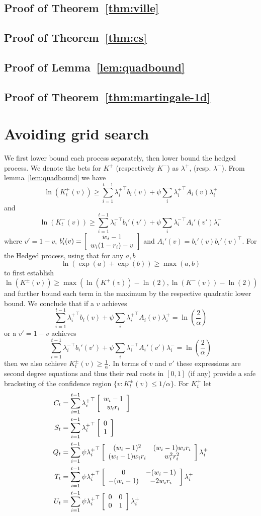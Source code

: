 \subsection{Proof of Theorem~\ref{thm:ville}}
\subsection{Proof of Theorem~\ref{thm:cs}}
\subsection{Proof of Lemma~\ref{lem:quadbound}}
\subsection{Proof of Theorem~\ref{thm:martingale-1d}}
\section{Avoiding grid search}
\label{app:nogrid2d}
We first lower bound each process separately, then lower bound
the hedged process. We denote the bets for $K^{+}$ (respectively
$K^{-}$) as $\lambda^{+}$, (resp. $\lambda^{-}$).
From lemma~\ref{lem:quadbound} we have
\[
\ln(K_t^{+}(v)) \geq \sum_{i=1}^{t-1} {\lambda_i^{+}}^\top b_i(v) + \psi \sum_i {\lambda_i^{+}}^\top A_i(v) {\lambda_i^{+}}
\]
and
\[
\ln(K_t^{-}(v)) \geq \sum_{i=1}^{t-1} {\lambda_i^{-}}^\top b_i'(v') + \psi \sum_i {\lambda_i^{-}}^\top A_i'(v') {\lambda_i^{-}}
\]
where $v'=1-v$, 
$b_i'(v)=
\left[\begin{array}{c} w_i-1 \\ w_i (1-r_i) -v \end{array}\right]
$
and $A_i'(v)=b_i'(v)b_i'(v)^\top$.
For the Hedged process, using that for any $a,b$
\[
\ln\left(\exp(a)+\exp(b)\right)\geq \max(a,b)
\]
to first establish
\[
\ln(K^{\pm}(v)) \geq \max(\ln(K^{+}(v))-\ln(2),\ln(K^{-}(v))-\ln(2))
\]
and further bound each term in the maximum by the respective 
quadratic lower bound. We conclude that
if a $v$ achieves 
\[
 \sum_{i=1}^{t-1} {\lambda_i^{+}}^\top b_i(v) + \psi \sum_i {\lambda_i^{+}}^\top A_i(v) \lambda_i^{+} = \ln\left(\frac{2}{\alpha}\right)
\]
or a $v'=1-v$ achieves 
\[
\sum_{i=1}^{t-1} {\lambda_i^{-}}^\top b_i'(v') + \psi \sum_i {\lambda_i^{-}}^\top A_i'(v') \lambda_i^{-} = \ln\left(\frac{2}{\alpha}\right)
\]
then we also achieve $K_t^{\pm}(v) \geq \frac{1}{\alpha}$.
In terms of $v$ and $v'$ these expressions are second degree
equations and thus their real roots in $[0,1]$ (if any) provide 
a safe bracketing of the confidence region $\{v:K_t^{\pm}(v)\leq 1/\alpha\}$. For $K_t^{+}$ let
\begin{align}
C_t&= \sum_{i=1}^{t-1} {\lambda_i^{+}}^\top \left[\begin{array}{c} w_i-1 \\ w_i r_i \end{array}\right] \label{eq:upsuffc}\\
S_t&= \sum_{i=1}^{t-1} {\lambda_i^{+}}^\top \left[\begin{array}{c} 0 \\ 1 \end{array}\right] \\
Q_t&= \sum_{i=1}^{t-1} \psi  {\lambda_i^{+}}^\top \left[\begin{array}{cc} (w_i-1)^2 & (w_i-1)w_i r_i \\ (w_i-1)w_i r_i & w_i^2r_i^2 \end{array}\right] \lambda_i^{+} \\
T_t&= \sum_{i=1}^{t-1} \psi  {\lambda_i^{+}}^\top \left[\begin{array}{cc} 0 & -(w_i-1) \\ -(w_i-1) & -2w_ir_i \end{array}\right] \lambda_i^{+} \\
U_t&=  \sum_{i=1}^{t-1} \psi {\lambda_i^{+}}^\top \left[\begin{array}{cc} 0 & 0 \\ 0 & 1 \end{array}\right] \lambda_i^{+} \label{eq:upsuffu}
\end{align}
